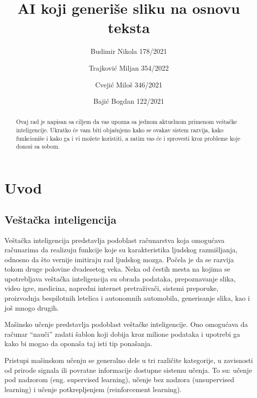 \documentclass[12pt, letterpaper]{article}
\begin{document}
\title{AI koji generiše sliku na osnovu teksta}
\author{Budimir Nikola 178/2021\\ \and Trajković Miljan 354/2022 \and Cvejić Miloš 346/2021\\ \and Bajić Bogdan 122/2021}
\maketitle

\begin{abstract}
    Ovaj rad je napisan sa ciljem da vas upozna sa jednom aktuelnom primenom veštačke inteligencije. Ukratko će vam biti objašnjeno kako se ovakav sistem razvija, kako funkcioniše i kako ga i vi možete koristiti, a zatim vas će i sprovesti kroz probleme koje donosi sa sobom.
\end{abstract}
\begin{tableofcontents}
\end{tableofcontents}

\pagebreak 

\section{Uvod} 

\subsection*{Veštačka inteligencija} 

Veštačka inteligencija predstavlja podoblast računarstva koja omogućava računarima da realizuju funkcije koje su karakteristika ljudskog razmišljanja, odnosno da što vernije imitiraju rad ljudskog mozga. Počela je da se razvija tokom druge polovine dvadesetog veka. Neka od čestih mesta na kojima se upotrebljava veštačka inteligencija su obrada podataka, prepoznavanje slika, video igre, medicina, napredni internet pretraživači, sistemi preporuke, proizvodnja bespilotnih letelica i autonomnih automobila, generisanje slika, kao i još mnogo drugih.  

  

Mašinsko učenje predstavlja podoblast veštačke inteligencije. Ono omogućava da računar “nauči” zadati šablon koji dobija kroz milione podataka i upotrebi ga kako bi mogao da oponaša taj isti tip ponašanja.   

  

Pristupi mašinskom učenju se generalno dele u tri različite kategorije, u zavisnosti od prirode signala ili povratne informacije dostupne sistemu učenja. To su: učenje pod nadzorom (eng. supervised learning), učenje bez nadzora (unsupervised learning) i učenje potkrepljenjem (reinforcement learning).  
\end{document}
